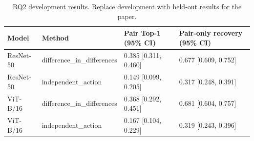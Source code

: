 \begin{table}[t]
\centering
\caption{RQ2 development results. Replace development with held-out results for the paper.}
\label{tab:rq2}
\begin{tabular}{llll}
\toprule
Model & Method & Pair Top-1 (95\% CI) & Pair-only recovery (95\% CI) \\
\midrule
ResNet-50 & difference\_in\_differences & 0.385 [0.311, 0.460] & 0.677 [0.609, 0.752] \\
ResNet-50 & independent\_action & 0.149 [0.099, 0.205] & 0.317 [0.248, 0.391] \\
ViT-B/16 & difference\_in\_differences & 0.368 [0.292, 0.451] & 0.681 [0.604, 0.757] \\
ViT-B/16 & independent\_action & 0.167 [0.104, 0.229] & 0.319 [0.243, 0.396] \\
\bottomrule
\end{tabular}
\end{table}
